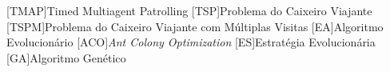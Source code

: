 \begin{acronym}[ACRONYM] 
[TMAP]{Timed Multiagent Patrolling}
[TSP]{Problema do Caixeiro Viajante}
[TSPM]{Problema do Caixeiro Viajante com Múltiplas Visitas}
[EA]{Algoritmo Evolucionário}
[ACO]{\textit{Ant Colony Optimization}}
[ES]{Estratégia Evolucionária}
[GA]{Algoritmo Genético}
\end{acronym}